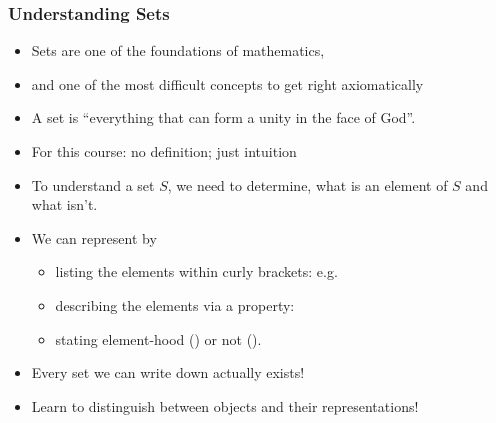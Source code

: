 \documentclass[notes,mh]{mikoslides}
\begin{document}
\begin{module}[id=sets-introduction]

\begin{frame}
  \frametitle{Understanding Sets}
  \begin{itemize}
  \item Sets are one of the foundations of mathematics,
  \item and one of the most difficult concepts to get right axiomatically
  \item
    \begin{omtext}[id=cantor-set.def,title=Early Definition Attempt]

      A set is ``everything that can form a unity in the face of God''. 
    \end{omtext}
  \item For this course: no definition; just intuition
  \item To understand a set $S$, we need to determine, what is an element of $S$
    and what isn't.
  \item
    \begin{definition}[display=flow,for={set,setdots,nsete,nsetli,nsetui,setst,inset,ninset,minset,minsetdots,nminset,nminsetdots,hasprop},
      title=Representations of Sets]
      We can represent  by 
      \begin{itemize}
      \item listing the elements within curly brackets: e.g. 
      \item describing the elements via a property: 
      \item stating element-hood () or not
        ().
      \end{itemize}
    \end{definition}
  \item 
    \begin{axiom}[id=set-comprehension.ax]
      Every set we can write down actually exists!
    \end{axiom}
  \item
    \begin{omtext}[title=Warning]
      Learn to distinguish between objects and their representations!
    \end{omtext}
  \end{itemize}
\end{frame}


\end{module}
\end{document}

